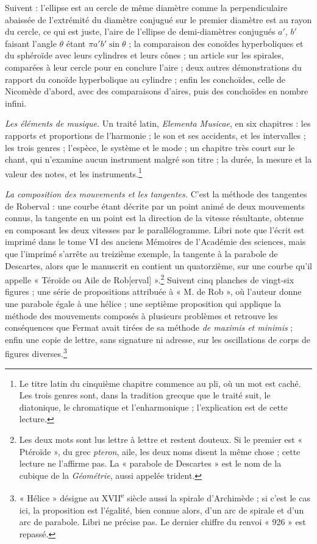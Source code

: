 \documentclass[11pt,a4paper]{article}
\begin{document}
Suivent : l'ellipse est au cercle de même diamètre comme la perpendiculaire
abaissée de l'extrémité du diamètre conjugué sur le premier diamètre est au
rayon du cercle, ce qui est juste, l'aire de l'ellipse de demi-diamètres
conjugués $a'$, $b'$ faisant l'angle $\theta$ étant $\pi a' b' \sin\theta$ ; la
comparaison des conoïdes hyperboliques et du sphéroïde avec leurs cylindres et
leurs cônes ; un article sur les spirales, comparées à leur cercle pour en
conclure l'aire ; deux autres démonstrations du rapport du conoïde hyperbolique
au cylindre ; enfin les conchoïdes, celle de Nicomède d'abord, avec des
comparaisons d'aires, puis des conchoïdes en nombre infini.

\emph{Les éléments de musique.} Un traité latin, \emph{Elementa Musicae}, en six
chapitres : les rapports et proportions de l'harmonie ; le son et ses
accidents, et les intervalles ; les trois genres ; l'espèce, le système et le
mode ; un chapitre très court sur le chant, qui n'examine aucun instrument
malgré son titre ; la durée, la mesure et la valeur des notes, et les
instruments.\footnote{Le titre latin du cinquième chapitre commence au pli,
où un mot est caché. Les trois genres sont, dans la tradition grecque que le
traité suit, le diatonique, le chromatique et l'enharmonique ; l'explication
est de cette lecture.}

\emph{La composition des mouvements et les tangentes.} C'est la méthode des
tangentes de Roberval : une courbe étant décrite par un point animé de deux
mouvements connus, la tangente en un point est la direction de la vitesse
résultante, obtenue en composant les deux vitesses par le parallélogramme.
Libri note que l'écrit est imprimé dans le tome VI des anciens Mémoires de
l'Académie des sciences, mais que l'imprimé s'arrête au treizième exemple, la
tangente à la parabole de Descartes, alors que le manuscrit en contient un
quatorzième, sur une courbe qu'il appelle « Téroïde ou Aile de
Rob[erval] ».\footnote{Les deux mots sont lus lettre à lettre et restent
douteux. Si le premier est « Ptéroïde », du grec \emph{pteron}, aile, les deux
noms disent la même chose ; cette lecture ne l'affirme pas. La « parabole de
Descartes » est le nom de la cubique de la \emph{Géométrie}, aussi appelée
trident.} Suivent cinq planches de vingt-six figures ; une série de
propositions attribuée à « M. de Rob », où l'auteur donne une parabole égale à
une hélice ; une septième proposition qui applique la méthode des mouvements
composés à plusieurs problèmes et retrouve les conséquences que Fermat avait
tirées de sa méthode \emph{de maximis et minimis} ; enfin une copie de lettre,
sans signature ni adresse, sur les oscillations de corps de figures
diverses.\footnote{« Hélice » désigne au XVII\textsuperscript{e}
siècle aussi la spirale d'Archimède ; si c'est le cas ici, la proposition est
l'égalité, bien connue alors, d'un arc de spirale et d'un arc de parabole.
Libri ne précise pas. Le dernier chiffre du renvoi « 926 » est repassé.}
\end{document}
